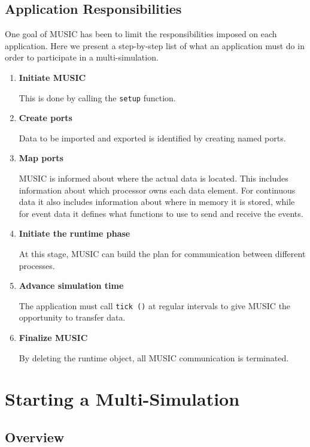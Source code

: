 \documentclass[a4paper]{report}
\begin{document}
\section{Application Responsibilities}

One goal of MUSIC has been to limit the responsibilities imposed on
each application.  Here we present a step-by-step list of what an
application must do in order to participate in a multi-simulation.

\begin{enumerate}
\item \textbf{Initiate MUSIC}

  This is done by calling the \lstinline!setup! function.
\item \textbf{Create ports}

  Data to be imported and exported is identified by creating named
  ports.
\item \textbf{Map ports}

  MUSIC is informed about where the actual data is located.
  This includes information about which processor owns each data
  element.  For continuous data it also includes information about
  where in memory it is stored, while for event data it defines what
  functions to use to send and receive the events.
\item \textbf{Initiate the runtime phase}

  At this stage, MUSIC can build the plan for communication between
  different processes.
\item \textbf{Advance simulation time}

  The application must call \lstinline!tick ()! at regular intervals
  to give MUSIC the opportunity to transfer data.
\item \textbf{Finalize MUSIC}

  By deleting the runtime object, all MUSIC communication is terminated.
\end{enumerate}


\chapter{Starting a Multi-Simulation}

\section{Overview}
\end{document}

